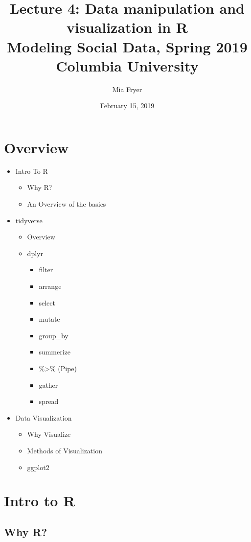 \documentclass{article}
\title{
Lecture 4: Data manipulation and visualization in R \\  %
Modeling Social Data, Spring 2019 \\   %
Columbia University                    %
}
\author{Mia Fryer}                     %
\date{February 15, 2019}                %
\begin{document}
\maketitle
\section{Overview}
\begin{itemize}
    \item Intro To R
        \begin{itemize}
            \item Why R?
            \item An Overview of the basics
        \end{itemize}
    \item tidyverse
        \begin{itemize}
            \item Overview
            \item dplyr
                \begin{itemize}
                     \item filter
                     \item arrange
                     \item select
                     \item mutate
                     \item group\_by
                     \item summerize
                     \item \%\textgreater\% (Pipe)
                     \item gather
                     \item spread
            \end{itemize}
        \end{itemize}
    \item Data Visualization
        \begin{itemize}
            \item Why Visualize
            \item Methods of Visualization
            \item ggplot2
        \end{itemize}
\end{itemize}


\section{Intro to R}
\subsection{Why R?}
\end{document}
